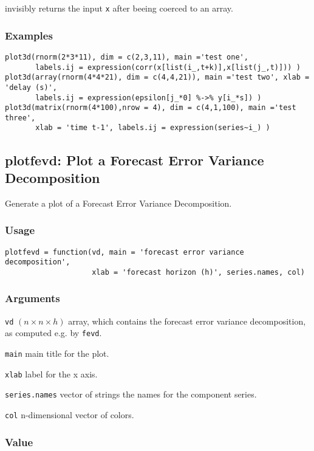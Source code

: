 \documentclass[]{article}
\begin{document}
invisibly returns the input \texttt{x} after beeing coerced to an array.
\subsubsection*{Examples}

\begin{verbatim}
plot3d(rnorm(2*3*11), dim = c(2,3,11), main ='test one',
       labels.ij = expression(corr(x[list(i_,t+k)],x[list(j_,t)])) )
plot3d(array(rnorm(4*4*21), dim = c(4,4,21)), main ='test two', xlab = 'delay (s)',
       labels.ij = expression(epsilon[j_*0] %->% y[i_*s]) )
plot3d(matrix(rnorm(4*100),nrow = 4), dim = c(4,1,100), main ='test three',
       xlab = 'time t-1', labels.ij = expression(series~i_) )
\end{verbatim}

\subsection{plotfevd: Plot a Forecast Error Variance
Decomposition}\label{plotfevd-plot-a-forecast-error-variance-decomposition}

Generate a plot of a Forecast Error Variance Decomposition.

\subsubsection*{Usage}\begin{verbatim}
plotfevd = function(vd, main = 'forecast error variance decomposition',
                    xlab = 'forecast horizon (h)', series.names, col)
\end{verbatim}\subsubsection*{Arguments}\begin{description}
\item \texttt{vd}  $(n\times n\times h)$ array, which contains the 
             forecast error variance decomposition, as computed e.g. 
             by \texttt{fevd}.
\item \texttt{main} main title for the plot.
\item \texttt{xlab} label for the x axis.
\item \texttt{series.names} vector of strings the names for the 
             component series.
\item \texttt{col} n-dimensional vector of colors.
\end{description}\subsubsection*{Value}
\end{document}
